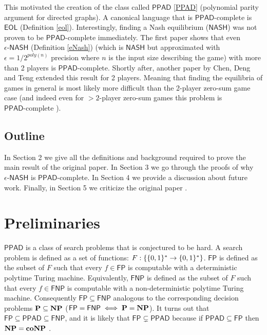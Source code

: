 \documentclass[11pt]{article}
\newcommand{\PPAD}{\mathsf{PPAD}}
\newcommand{\FP}{\mathsf{FP}}
\newcommand{\FNP}{\mathsf{FNP}}
\newcommand{\PPADc}{\mathsf{PPAD}\text{-complete}}
\newcommand{\NASH}{\mathsf{NASH}}
\newcommand{\eNASH}{\mathsf{\text{$\epsilon$-}NASH}}
\newcommand{\eol}{\mathsf{EOL}}
\begin{document}
This motivated the creation of the class called $\PPAD$ \ref{PPAD} (polynomial parity argument for directed graphs). A canonical language that is $\PPADc$ is $\eol$ (Definition \ref{eol}). Interestingly, finding a Nash equilibrium ($\NASH$) was not proven to be $\PPADc$ immediately. The first paper shows \cite{daskalakis2009complexity} that even $\eNASH$ (Definition \ref{eNash}) (which is $\NASH$ but approximated with $\epsilon = 1/2^{poly(n)}$ precision where $n$ is the input size describing the game) with more than 2 players is $\PPADc$. Shortly after, another paper by Chen, Deng and Teng \cite{chen2007settling} extended this result for 2 players. Meaning that finding the equilibria of games in general is most likely more difficult than the 2-player zero-sum game case (and indeed even for $>2$-player zero-sum games this problem is $\PPADc$ \cite{cai2011minmax}).



\subsection{Outline}
In Section 2 we give all the definitions and background required to prove the main result of the original paper\cite{daskalakis2009complexity}. In Section 3 we go through the proofs of why $\eNASH$ is $\PPADc$. In Section 4 we provide a discussion about future work. Finally, in Section 5 we criticize the original paper \cite{daskalakis2009complexity}.
\section{Preliminaries}

$\PPAD$ is a class of search problems that is conjectured to be hard. A search problem is defined as a set of functions: $F:\{\{0,1\}^* \to \{0,1\}^*\}$. $\FP$ is defined as the subset of $F$ such that every $f \in \FP$ is computable with a deterministic polytime Turing machine. Equivalently, $\FNP$ is defined as the subset of $F$ such that every $f \in \FNP$ is computable with a non-deterministic polytime Turing machine. Consequently $\FP \subseteq \FNP$ analogous to the corresponding decision problems $\mathbf{P} \subseteq \mathbf{NP}$ ($\FP = \FNP \iff \P = \NP$). It turns out that $\FP \subseteq \PPAD \subseteq \FNP$, and it is likely that $\FP \subsetneq \PPAD$ because if $\PPAD \subseteq \FP$ then $\mathbf{NP} = \mathbf{coNP}$ \cite{daskalakis2009complexity}.
\end{document}
